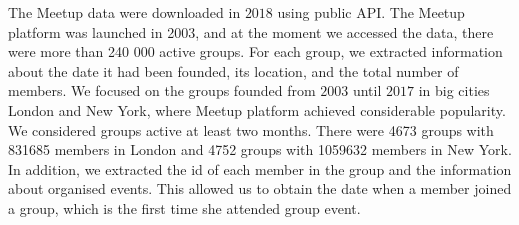 

The Meetup data were downloaded in $2018$ using public API. The Meetup platform was launched in 2003, and at the moment we accessed the data, there were more than 240 000 active groups. For each group, we extracted information about the date it had been founded, its location, and the total number of members. We focused on the groups founded from $2003$ until $2017$ in big cities London and New York, where Meetup platform achieved considerable popularity. We considered groups active at least two months. There were 4673 groups with 831685 members in London and 4752 groups with 1059632 members in New York. In addition, we extracted the id of each member in the group and the information about organised events. This allowed us to obtain the date when a member joined a group, which is the first time she attended group event. 

